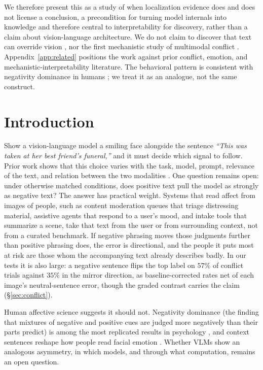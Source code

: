 \documentclass{article}
\begin{document}
We therefore present this as a study of when localization evidence does and does not license a conclusion, a precondition for turning model internals into knowledge and therefore central to interpretability for discovery, rather than a claim about vision-language architecture. We do not claim to discover that text can override vision \citep{deng2025blindfaith, contextvqa2026}, nor the first mechanistic study of multimodal conflict \citep{seeingoverrides2026}. Appendix~\ref{app:related} positions the work against prior conflict, emotion, and mechanistic-interpretability literature. The behavioral pattern is consistent with negativity dominance in humans \citep{rozin2001, baumeister2001}; we treat it as an analogue, not the same construct.

\else
\section{Introduction}
\label{sec:intro}

Show a vision-language model a smiling face alongside the sentence \emph{``This was taken at her best friend's funeral,''} and it must decide which signal to follow. Prior work shows that this choice varies with the task, model, prompt, relevance of the text, and relation between the two modalities \citep{deng2025blindfaith, mixedsignals2025, contextvqa2026, signpost2026}. One question remains open: under otherwise matched conditions, does positive text pull the model as strongly as negative text? The answer has practical weight. Systems that read affect from images of people, such as content moderation queues that triage distressing material, assistive agents that respond to a user's mood, and intake tools that summarize a scene, take that text from the user or from surrounding context, not from a curated benchmark. If negative phrasing moves those judgments further than positive phrasing does, the error is directional, and the people it puts most at risk are those whom the accompanying text already describes badly. In our tests it is also large: a negative sentence flips the top label on $57\%$ of conflict trials against $35\%$ in the mirror direction, as baseline-corrected rates net of each image's neutral-sentence error, though the graded contrast carries the claim (\S\ref{sec:conflict}).

Human affective science suggests it should not. Negativity dominance (the finding that mixtures of negative and positive cues are judged more negatively than their parts predict) is among the most replicated results in psychology \citep{rozin2001, baumeister2001}, and context sentences reshape how people read facial emotion \citep{aviezer2008, aviezer2012}. Whether VLMs show an analogous asymmetry, in which models, and through what computation, remains an open question.
\end{document}
